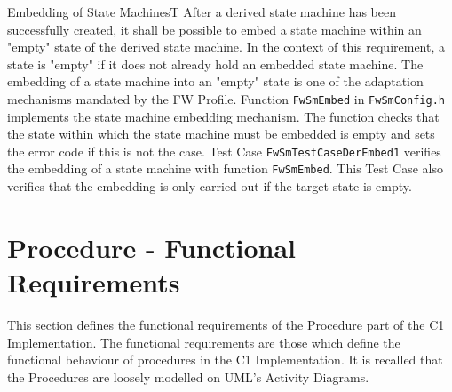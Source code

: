 \documentclass[requirements]{../fwprofile}
\begin{document}
\begin{fw_req_note}{Embedding of State Machines}{T}
{After a derived state machine has been successfully created, it shall 
be possible to embed a state machine within an "empty" state of the derived state machine.}
{In the context of this requirement, a state is "empty" if it does not already 
hold an embedded state machine.}
{The embedding of a state machine into an "empty" state is one of the 
adaptation mechanisms mandated by the FW Profile.}
{ Function \texttt{FwSmEmbed} in \texttt{FwSmConfig.h} implements the 
state machine embedding mechanism. 
The function checks that the state within which the state machine must be embedded is empty 
and sets the error code if this is not the case.} 
{Test Case \texttt{FwSmTestCaseDerEmbed1} verifies the embedding of a 
state machine with function \texttt{FwSmEmbed}. 
This Test Case also verifies that the embedding is only carried out if the target state is empty.}
\end{fw_req_note}



\section{Procedure - Functional Requirements}\label{sec:prFncReqs}

This section defines the functional requirements of the Procedure part of the C1 Implementation. 
The functional requirements are those which define the functional behaviour of procedures in the C1 Implementation.
It is recalled that the Procedures are loosely modelled on UML's Activity Diagrams.
\end{document}
